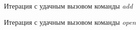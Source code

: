 \documentclass[12pt,a4paper]{report}
\begin{document}
\begin{figure}[H]
\caption{Итерация с удачным вызовом команды \textit{add}}
\label{fig:4}
\end{figure}
\begin{figure}[H]
\caption{Итерация с удачным вызовом команды \textit{open}}
\label{fig:5}
\end{figure}
\end{document}
